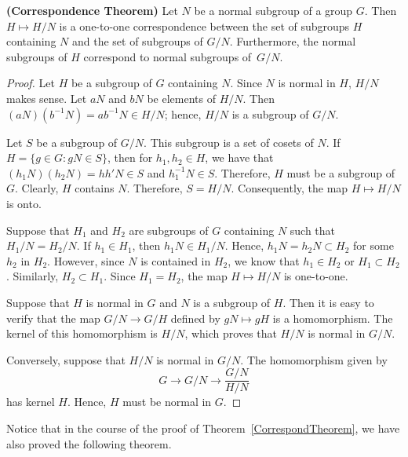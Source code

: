  
\begin{theorem} {\bf (Correspondence Theorem)}\label{CorrespondTheorem}
Let $N$ be a normal subgroup of a group $G$. Then $H \mapsto H/N$
is a one-to-one correspondence between the set of subgroups $H$
containing $N$  and the set of subgroups of $G/N$. Furthermore, the
normal subgroups of $H$ correspond to normal subgroups of~$G/N$. 
\end{theorem}
 
 
\begin{proof}
Let $H$ be a subgroup of $G$ containing $N$. Since $N$ is normal in
$H$, $H/N$ makes sense.  Let $aN$ and $bN$ be elements of $H/N$. Then
$(aN)( b^{-1} N )= ab^{-1}N \in H/N$; hence, $H/N$ is a subgroup of
$G/N$. 


Let $S$ be a subgroup of $G/N$. This subgroup is a set of cosets of
$N$.  If  $H= \{ g \in G : gN \in S \}$, then for $h_1, h_2 \in H$, we
have that $(h_1 N)( h_2 N )= h h' N \in S$ and $h_1^{-1} N \in S$.
Therefore, $H$ must be a subgroup of $G$. Clearly, $H$ contains $N$.
Therefore, $S = H / N$. Consequently, the map  $H \mapsto H/N$ is
onto. 

 
Suppose that $H_1$ and $H_2$ are subgroups of $G$ containing $N$ such
that $H_1/N = H_2/N$. If $h_1 \in H_1$, then $h_1 N \in H_1/N$. Hence,
$h_1 N = h_2 N \subset H_2$ for some $h_2$ in $H_2$. However, since
$N$ is contained in $H_2$, we know that $h_1 \in H_2$ or $H_1 \subset
H_2$. Similarly, $H_2 \subset H_1$.  Since $H_1 = H_2$, the map  $H
\mapsto H/N$ is one-to-one. 




 
Suppose that $H$ is normal in $G$ and $N$ is a subgroup of $H$.  Then
it is easy to verify that the map $G/N \rightarrow G/H$ defined by $gN
\mapsto gH$ is  a homomorphism.  The kernel of this homomorphism is
$H/N$, which proves that $H/N$ is normal in $G/N$. 
 
 
Conversely, suppose that $H/N$ is normal in $G/N$. The homomorphism
given by 
\[
G \rightarrow G/N \rightarrow \frac{G/N}{H/N}
\]
has kernel $H$. Hence, $H$ must be normal in $G$.
\end{proof}
 
\medskip
 
 
Notice that in the course of the proof of Theorem~\ref{CorrespondTheorem}, we have also
proved the following theorem. 
 
